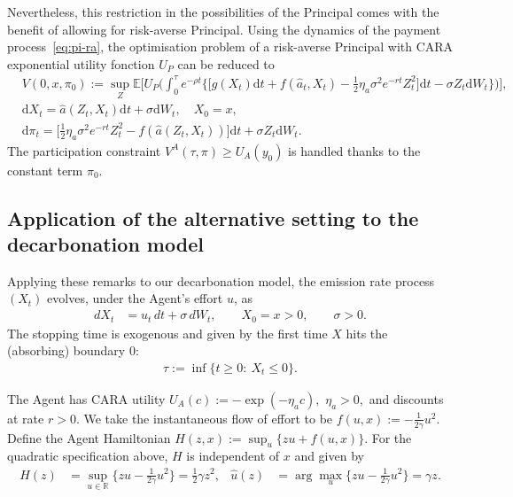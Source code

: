\documentclass[a4paper,10pt]{article}
\newcommand{\E}{\mathbb{E}}
\newcommand{\dd}{\mathrm{d}}
\theoremstyle{definition}
\theoremstyle{plain}
\numberwithin{equation}{section}
\newcommand{\hs}{\vspace{3mm}}
\begin{document}
\hs

Nevertheless, this restriction in the possibilities of the Principal comes with the benefit of allowing for risk-averse Principal. Using the dynamics of the payment process~\eqref{eq:pi-ra}, the optimisation problem of a risk-averse Principal with CARA exponential utility fonction $U_P$ can be reduced to
\begin{align}\label{eq:Pbis}
&V(0,x,\pi_0) := 
\sup_{Z} \E\Big[U_P\Big(\int_0^\tau  e^{-\rho t} \big\{ \big[g(X_t) \dd t + f(\hat a_t, X_t) - \frac12 \eta_a \sigma^2 e^{- r t} Z_t^2 \big] \dd t - \sigma Z_t \dd W_t \big\} \Big)\Big],  \\
&\dd X_t  = \hat{a}(Z_t,X_t) \dd t + \sigma \dd W_t, \quad X_0 = x,\\
&\dd \pi_t  =  \big[ \frac12 \eta_a \sigma^2 e^{- r t} Z_t^2 - f(\hat{a}(Z_t,X_t)) \big] \dd t + \sigma  Z_t \dd W_t.
\end{align}
 The participation constraint $V^A(\tau,\pi) \geq U_A(y_0)$  is handled thanks to the constant term $\pi_0$. 


\subsection{Application of the alternative setting to the decarbonation model}

Applying these remarks to our decarbonation model, the emission rate process $(X_t)$ evolves, under the Agent's effort $u$, as
\begin{align}
dX_t &= u_t\,dt + \sigma\,dW_t,
\qquad X_0=x>0,
\qquad \sigma>0.
\end{align}
The stopping time is exogenous and given by the first time $X$ hits the (absorbing) boundary $0$:
\begin{align}
\tau := \inf\{t\ge 0:\ X_t \le 0\}.
\end{align}

The Agent has CARA utility $U_A(c) := -\exp(-\eta_a c),$
$\eta_a>0,$ and discounts at rate $r>0$. We take the instantaneous flow of effort to be
$f(u,x) := -\frac{1}{2\gamma}u^2.$ Define the Agent Hamiltonian
$H(z,x) := \sup_{u}\{zu + f(u,x)\}.$ For the quadratic specification above, $H$ is independent of $x$ and given by
\begin{align}
H(z) &= \sup_{u\in\mathbb{R}}\Big\{zu - \frac{1}{2\gamma}u^2\Big\}
      = \frac{1}{2}\gamma z^2,
&\hat u(z) &= \arg\max_{u}\Big\{zu - \frac{1}{2\gamma}u^2\Big\} = \gamma z.
\end{align}
\end{document}
